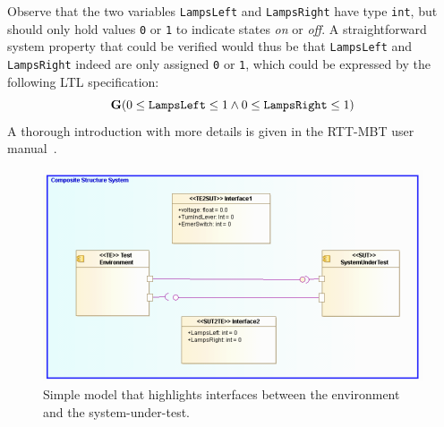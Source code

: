 %
%
%
Observe that the two variables {\tt LampsLeft} and {\tt LampsRight} have type {\tt int}, but should only hold values {\tt 0} or {\tt 1} to indicate states \emph{on} or \emph{off}.
%
A straightforward system property that could be verified would thus be that {\tt LampsLeft} and {\tt LampsRight} indeed are only assigned {\tt 0} or {\tt 1}, which could be expressed by the following LTL specification:
%
%
%
\[
\mathbf{G} (0 \leq {\tt LampsLeft} \leq 1 \wedge 0 \leq {\tt LampsRight} \leq 1)
\]
%
%
%
A thorough introduction with more details is given in the RTT-MBT user manual~\cite{rttmbtmanual}.
%
%
%
\begin{figure}
\centerline{\includegraphics[width=\textwidth]{figures/VSI-modelio_turn_indication_small_toplevel_composite.png}}
\caption{Simple model that highlights interfaces between the environment and
  the system-under-test.}
\label{figure:vsi-simple}
\end{figure}
